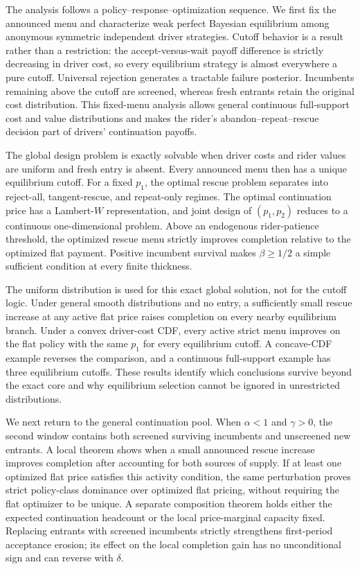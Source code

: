 \documentclass[mnsc,blindrev]{informs3}
\begin{document}
The analysis follows a policy--response--optimization sequence.  We first fix
the announced menu and characterize weak perfect Bayesian equilibrium among
anonymous symmetric independent driver strategies.  Cutoff behavior is a
result rather than a restriction: the accept-versus-wait payoff difference is
strictly decreasing in driver cost, so every equilibrium strategy is almost
everywhere a pure cutoff.  Universal rejection generates a tractable failure
posterior.  Incumbents remaining above the cutoff are screened, whereas fresh
entrants retain the original cost distribution.  This fixed-menu analysis
allows general continuous full-support cost and value distributions and makes
the rider's abandon--repeat--rescue decision part of drivers' continuation
payoffs.

The global design problem is exactly solvable when driver costs and rider
values are uniform and fresh entry is absent.  Every announced menu then has a
unique equilibrium cutoff.  For a fixed $p_1$, the optimal rescue problem
separates into reject-all, tangent-rescue, and repeat-only regimes.  The
optimal continuation price has a Lambert-$W$ representation, and joint design
of $(p_1,p_2)$ reduces to a continuous one-dimensional problem.  Above an
endogenous rider-patience threshold, the optimized rescue menu strictly
improves completion relative to the optimized flat payment.  Positive
incumbent survival makes $\beta\ge1/2$ a simple sufficient condition at every
finite thickness.

The uniform distribution is used for this exact global solution, not for the
cutoff logic.  Under general smooth distributions and no entry, a sufficiently
small rescue increase at any active flat price raises completion on every
nearby equilibrium branch.  Under a convex driver-cost CDF, every active
strict menu improves on the flat policy with the same $p_1$ for every
equilibrium cutoff.  A concave-CDF example reverses the comparison, and a
continuous full-support example has three equilibrium cutoffs.  These results
identify which conclusions survive beyond the exact core and why equilibrium
selection cannot be ignored in unrestricted distributions.

We next return to the general continuation pool.  When $\alpha<1$ and
$\gamma>0$, the second window contains both screened surviving incumbents and
unscreened new entrants.  A local theorem shows when a small announced rescue
increase improves completion after accounting for both sources of supply.  If
at least one optimized flat price satisfies this activity condition, the same
perturbation proves strict policy-class dominance over optimized flat pricing,
without requiring the flat optimizer to be unique.  A separate composition
theorem holds either the expected continuation headcount or the local
price-marginal capacity fixed.  Replacing entrants with screened incumbents
strictly strengthens first-period acceptance erosion; its effect on the local
completion gain has no unconditional sign and can reverse with $\delta$.
\end{document}
